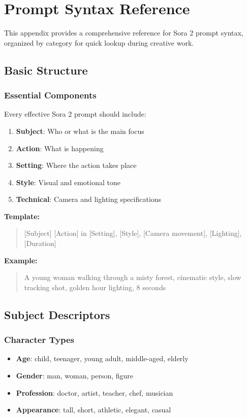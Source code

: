 \chapter{Prompt Syntax Reference}
\label{app:prompt-syntax}

This appendix provides a comprehensive reference for Sora 2 prompt syntax, organized by category for quick lookup during creative work.

\section{Basic Structure}

\subsection{Essential Components}
Every effective Sora 2 prompt should include:

\begin{enumerate}
\item \textbf{Subject}: Who or what is the main focus
\item \textbf{Action}: What is happening
\item \textbf{Setting}: Where the action takes place
\item \textbf{Style}: Visual and emotional tone
\item \textbf{Technical}: Camera and lighting specifications
\end{enumerate}

\textbf{Template:}
\begin{quote}
[Subject] [Action] in [Setting], [Style], [Camera movement], [Lighting], [Duration]
\end{quote}

\textbf{Example:}
\begin{quote}
A young woman walking through a misty forest, cinematic style, slow tracking shot, golden hour lighting, 8 seconds
\end{quote}

\section{Subject Descriptors}

\subsection{Character Types}
\begin{itemize}
\item \textbf{Age}: child, teenager, young adult, middle-aged, elderly
\item \textbf{Gender}: man, woman, person, figure
\item \textbf{Profession}: doctor, artist, teacher, chef, musician
\item \textbf{Appearance}: tall, short, athletic, elegant, casual
\end{itemize}

